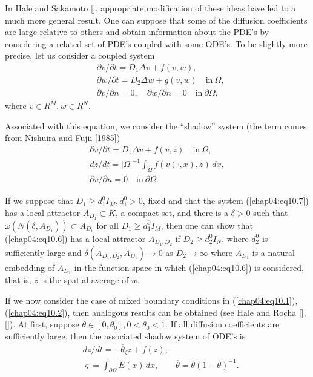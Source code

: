 \documentclass{surv-l}
\theoremstyle{plain}
\theoremstyle{definition}
\numberwithin{equation}{section}
\numberwithin{figure}{chapter}
\begin{document}
In Hale and Sakamoto [\citeyear{1987hs}], appropriate modification of these ideas have led to a much more general result. One can suppose that some of the diffusion coefficients are large relative to others and obtain information about the PDE's by considering a related set of PDE's coupled with some ODE's. To be slightly more precise, let us consider a coupled system
\begin{equation}\label{chap04:eq10.6}
\begin{split}
&\partial v/\partial t=D_{1}\Delta v+f(v, w),\\
&\partial w/\partial t=D_{2}\Delta w+g(v, w)\quad \mathrm{in}\ \Omega,\\
&\partial v/\partial n=0,\quad \partial w/\partial n=0\quad \mathrm{in}\ \partial\Omega,
\end{split}
\end{equation}
where $v\in R^{M}, w\in R^{N}$.

Associated with this equation, we consider the ``shadow'' system (the term comes from Nishuira and Fujii [1985])
\begin{equation}\label{chap04:eq10.7}
\begin{split}
\partial v/\partial t=D_{1}\Delta v+f(v, z)\quad \mathrm{in}\ \Omega,\\
dz/dt=|\Omega|^{-1}\int_{\Omega}f(v(\cdot, x), z)\, dx,\\
\partial v/\partial n=0\quad \mathrm{in}\ \partial\Omega.
\end{split}
\end{equation}

If we suppose that $D_{1}\geq d_{1}^{0}I_{M}, d_{1}^{0}>0$, fixed and that the system (\ref{chap04:eq10.7}) has a local attractor $A_{D_{1}} \subset K$, a compact set, and there is a $\delta>0$ such that $\omega(N(\delta, A_{D_{1}}))\subset A_{D_{1}}$ for all $D_{1}\geq d_{1}^{0}I_{M}$, then one can show that (\ref{chap04:eq10.6}) has a local attractor $A_{D_{1},D_{2}}$ if $D_{2}\geq d_{2}^{0}I_{N}$, where $d_{2}^{0}$ is sufficiently large and $\delta(A_{D_{1},D_{2}},\tilde{A}_{D_{1}})\rightarrow 0$ as $ D_{2}\rightarrow\infty$ where $\tilde{A}_{D_{1}}$ is a natural embedding of $A_{D_{1}}$ in the function space in which (\ref{chap04:eq10.6}) is considered, that is, $z$ is the spatial average of $w$.

If we now consider the case of mixed boundary conditions in (\ref{chap04:eq10.1}), (\ref{chap04:eq10.2}), then analogous results can be obtained (see Hale and Rocha [\citeyear{1987hra}], [\citeyear{1987hrb}]). At first, suppose $\theta\in[0, \theta_{0}], 0<\theta_{0}<1$. If all diffusion coefficients are sufficiently large, then the associated shadow system of ODE's is
\begin{equation}\label{chap04:eq10.8}
\begin{split}
&dz/dt=-\overline{\theta}_{\zeta}z+f(z),\\
&\varsigma=\int_{\partial\Omega}E(x)\,dx,\quad\quad \overline{\theta}=\theta(1-\theta)^{-1}.
\end{split}
\end{equation}
\end{document}
